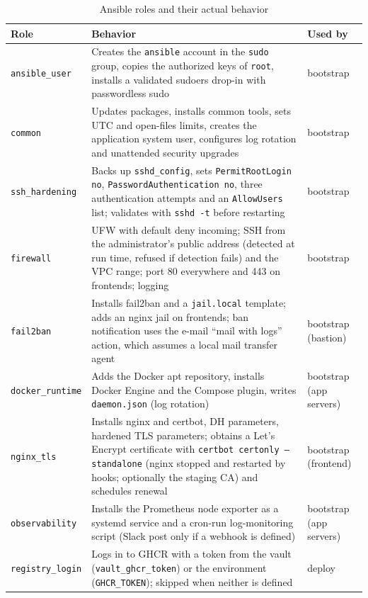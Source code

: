 \begin{table}[htbp]
\centering
\caption{Ansible roles and their actual behavior}
\label{tab:roles-impl}
\renewcommand{\arraystretch}{1.1}
\footnotesize
\begin{tabularx}{\linewidth}{@{}l X l@{}}
\toprule
\textbf{Role} & \textbf{Behavior} & \textbf{Used by} \\
\midrule
\texttt{ansible\_user} & Creates the \texttt{ansible} account in the \texttt{sudo} group, copies the authorized keys of \texttt{root}, installs a validated sudoers drop-in with passwordless sudo & bootstrap \\
\texttt{common} & Updates packages, installs common tools, sets UTC and open-files limits, creates the application system user, configures log rotation and unattended security upgrades & bootstrap \\
\texttt{ssh\_hardening} & Backs up \texttt{sshd\_config}, sets \texttt{PermitRootLogin no}, \texttt{PasswordAuthentication no}, three authentication attempts and an \texttt{AllowUsers} list; validates with \texttt{sshd -t} before restarting & bootstrap \\
\texttt{firewall} & UFW with default deny incoming; SSH from the administrator's public address (detected at run time, refused if detection fails) and the VPC range; port 80 everywhere and 443 on frontends; logging & bootstrap \\
\texttt{fail2ban} & Installs fail2ban and a \texttt{jail.local} template; adds an nginx jail on frontends; ban notification uses the e-mail ``mail with logs'' action, which assumes a local mail transfer agent & bootstrap (bastion) \\
\texttt{docker\_runtime} & Adds the Docker apt repository, installs Docker Engine and the Compose plugin, writes \texttt{daemon.json} (log rotation) & bootstrap (app servers) \\
\texttt{nginx\_tls} & Installs nginx and certbot, DH parameters, hardened TLS parameters; obtains a Let's Encrypt certificate with \texttt{certbot certonly --standalone} (nginx stopped and restarted by hooks; optionally the staging CA) and schedules renewal & bootstrap (frontend) \\
\texttt{observability} & Installs the Prometheus node exporter as a systemd service and a cron-run log-monitoring script (Slack post only if a webhook is defined) & bootstrap (app servers) \\
\texttt{registry\_login} & Logs in to GHCR with a token from the vault (\texttt{vault\_ghcr\_token}) or the environment (\texttt{GHCR\_TOKEN}); skipped when neither is defined & deploy \\

\end{tabularx}
\end{table}
